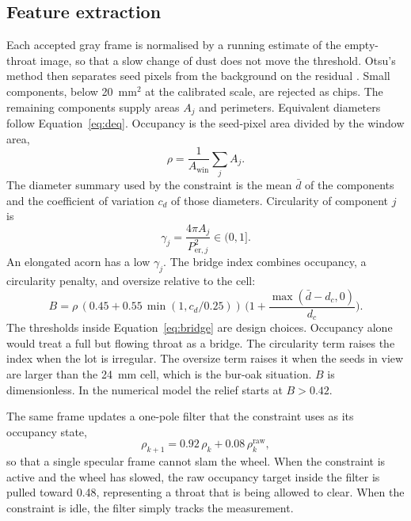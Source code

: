 \subsection{Feature extraction}
\label{sec:features}

Each accepted gray frame is normalised by a running estimate of the empty-throat image, so that a slow change of dust does not move the threshold. Otsu's method then separates seed pixels from the background on the residual \cite{otsu1979,gonzalez2018}. Small components, below 20~mm$^2$ at the calibrated scale, are rejected as chips. The remaining components supply areas $A_j$ and perimeters. Equivalent diameters follow Equation~\eqref{eq:deq}. Occupancy is the seed-pixel area divided by the window area,
\begin{equation}
\rho = \frac{1}{A_{\mathrm{win}}}\sum_j A_j.
\label{eq:rho}
\end{equation}
The diameter summary used by the constraint is the mean $\bar d$ of the components and the coefficient of variation $c_d$ of those diameters. Circularity of component $j$ is
\begin{equation}
\gamma_j = \frac{4\pi A_j}{P_{\mathrm{er},j}^2}\in(0,1].
\label{eq:circ}
\end{equation}
An elongated acorn has a low $\gamma_j$. The bridge index combines occupancy, a circularity penalty, and oversize relative to the cell:
\begin{equation}
B = \rho\,(0.45 + 0.55\,\min(1, c_d/0.25))\,\Big(1 + \frac{\max(\bar d - d_c, 0)}{d_c}\Big).
\label{eq:bridge}
\end{equation}
The thresholds inside Equation~\eqref{eq:bridge} are design choices. Occupancy alone would treat a full but flowing throat as a bridge. The circularity term raises the index when the lot is irregular. The oversize term raises it when the seeds in view are larger than the 24~mm cell, which is the bur-oak situation. $B$ is dimensionless. In the numerical model the relief starts at $B>0.42$.

The same frame updates a one-pole filter that the constraint uses as its occupancy state,
\begin{equation}
\rho_{k+1} = 0.92\,\rho_k + 0.08\,\rho^{\mathrm{raw}}_k,
\label{eq:rhofilter}
\end{equation}
so that a single specular frame cannot slam the wheel. When the constraint is active and the wheel has slowed, the raw occupancy target inside the filter is pulled toward 0.48, representing a throat that is being allowed to clear. When the constraint is idle, the filter simply tracks the measurement.

